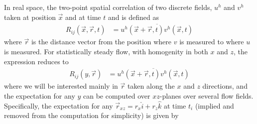 \documentclass[letterpaper,11pt,nointlimits,reqno]{amsart}
\begin{document}
In real space, the two-point spatial correlation of two discrete fields, $u^h$ and
$v^h$ taken at position $\vec{x}$ and at time $t$ and is defined as 
%
\begin{equation}
\begin{aligned}
R_{ij} \left( \vec{x}, \vec{r}, t \right) 
  &=   \overline{ 
       u^h \left( \vec{x}+ \vec{r}, t \right)  
       v^h \left( \vec{x}         , t \right) 
       }
\end{aligned}
\end{equation}
%
where $\vec{r}$ is the distance vector from the position where $v$ is measured
to where $u$ is measured. For statistically steady flow, with homogenity in 
both $x$ and $z$, the expression reduces to  
%
\begin{equation}
\begin{aligned}
R_{ij} \left( y, \vec{r} \right) 
  &=   \overline{
       u^h \left( \vec{x}+ \vec{r}, t \right)
       v^h \left( \vec{x}         , t \right) 
       }
\end{aligned}
\end{equation}
%
where we will be interested mainly in $\vec{r}$ taken along the $x$ and 
$z$ directions, and the expectation for any $y$ can be computed over 
$xz$-planes over several flow fields. Specifically, the expectation 
for any $\vec{r}_{xz} = r_x \hat{i} + r_z \hat{k}$ at time $t_i$ (implied and
removed from the computation for simplicity) is given by
%
\end{document}
